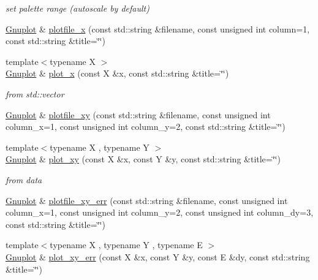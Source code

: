 \begin{DoxyCompactItemize}
\begin{DoxyCompactList}\small\item\em set palette range (autoscale by default) \item\end{DoxyCompactList}\item 
\hyperlink{class_gnuplot}{Gnuplot} \& \hyperlink{class_gnuplot_a4fc34218cdfdd27a65b92eea1f1f9e84}{plotfile\_\-x} (const std::string \&filename, const unsigned int column=1, const std::string \&title=\char`\"{}\char`\"{})
\item 
{\footnotesize template$<$typename X $>$ }\\\hyperlink{class_gnuplot}{Gnuplot} \& \hyperlink{class_gnuplot_aa00fcd4061a34332f8695276527b9f61}{plot\_\-x} (const X \&x, const std::string \&title=\char`\"{}\char`\"{})
\begin{DoxyCompactList}\small\item\em from std::vector \item\end{DoxyCompactList}\item 
\hyperlink{class_gnuplot}{Gnuplot} \& \hyperlink{class_gnuplot_a10e1fc7344bd726faa2d70cd5ced5e5e}{plotfile\_\-xy} (const std::string \&filename, const unsigned int column\_\-x=1, const unsigned int column\_\-y=2, const std::string \&title=\char`\"{}\char`\"{})
\item 
{\footnotesize template$<$typename X , typename Y $>$ }\\\hyperlink{class_gnuplot}{Gnuplot} \& \hyperlink{class_gnuplot_a2a7ded45a0d9bd6f6149866810540c5a}{plot\_\-xy} (const X \&x, const Y \&y, const std::string \&title=\char`\"{}\char`\"{})
\begin{DoxyCompactList}\small\item\em from data \item\end{DoxyCompactList}\item 
\hyperlink{class_gnuplot}{Gnuplot} \& \hyperlink{class_gnuplot_afe9d44ba12f617188111ab915010f3ab}{plotfile\_\-xy\_\-err} (const std::string \&filename, const unsigned int column\_\-x=1, const unsigned int column\_\-y=2, const unsigned int column\_\-dy=3, const std::string \&title=\char`\"{}\char`\"{})
\item 
{\footnotesize template$<$typename X , typename Y , typename E $>$ }\\\hyperlink{class_gnuplot}{Gnuplot} \& \hyperlink{class_gnuplot_acf63292d401a8012a82ac69ec2726d67}{plot\_\-xy\_\-err} (const X \&x, const Y \&y, const E \&dy, const std::string \&title=\char`\"{}\char`\"{})

\end{DoxyCompactItemize}
